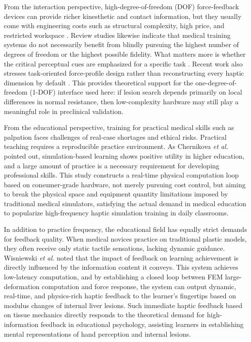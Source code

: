 \documentclass{ieeeaccess}
\begin{document}
From the interaction perspective, high-degree-of-freedom (DOF) force-feedback devices can provide richer kinesthetic and contact information, but they usually come with engineering costs such as structural complexity, high price, and restricted workspace \cite{agboh2016six}. Review studies likewise indicate that medical training systems do not necessarily benefit from blindly pursuing the highest number of degrees of freedom or the highest possible fidelity. What matters more is whether the critical perceptual cues are emphasized for a specific task \cite{overtoom2019haptic,rangarajan2020systematic}. Recent work also stresses task-oriented force-profile design rather than reconstructing every haptic dimension by default \cite{bjelland2025haptic}. This provides theoretical support for the one-degree-of-freedom (1-DOF) interface used here: if lesion search depends primarily on local differences in normal resistance, then low-complexity hardware may still play a meaningful role in preclinical validation.

From the educational perspective, training for practical medical skills such as palpation faces challenges of real-case shortages and ethical risks. Practical teaching requires a reproducible practice environment. As Chernikova \emph{et al.} \cite{chernikova2020simulation} pointed out, simulation-based learning shows positive utility in higher education, and a large amount of practice is a necessary requirement for developing professional skills. This study constructs a real-time physical computation loop based on consumer-grade hardware, not merely pursuing cost control, but aiming to break the physical space and equipment quantity limitations imposed by traditional medical simulators, satisfying the actual demand in medical education to popularize high-frequency haptic simulation training in daily classrooms.

In addition to practice frequency, the educational field has equally strict demands for feedback quality. When medical novices practice on traditional plastic models, they often receive only static tactile sensations, lacking dynamic guidance. Wisniewski \emph{et al.} \cite{wisniewski2020power} noted that the impact of feedback on learning achievement is directly influenced by the information content it conveys. This system achieves low-latency computation, and by establishing a closed loop between FEM large-deformation computation and force response, the system can output dynamic, real-time, and physics-rich haptic feedback to the learner's fingertips based on modulus changes of internal liver lesions. Such immediate haptic feedback based on tissue mechanics directly responds to the theoretical demand for high-information feedback in educational psychology, assisting learners in establishing mental representations of hand perception and internal lesions.
\end{document}
